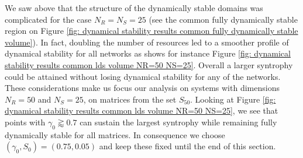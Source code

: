 \documentclass[12pt, titlepage]{report}
\begin{document}
We saw above that the structure of the dynamically stable domains was complicated for the case $N_R=N_S=25$ (see \eg the common fully dynamically stable region on Figure \ref{fig: dynamical stability results common fully dynamically stable volume}). In fact, doubling the number of resources led to a smoother profile of dynamical stability for all networks as shows for instance Figure \ref{fig: dynamical stability results common lds volume NR=50 NS=25}. Overall a larger syntrophy could be attained without losing dynamical stability for any of the networks. These considerations make us focus our analysis on systems with dimensions $N_R=50$ and $N_S=25$, \ie on matrices from the set $S_{50}$.
Looking at Figure \ref{fig: dynamical stability results common lds volume NR=50 NS=25}, we see that points with $\gamma_0 \gtrapprox 0.7$ can sustain the largest syntrophy while remaining fully dynamically stable for all matrices. In consequence we choose $(\gamma_0, S_0)=(0.75, 0.05)$ and keep these fixed until the end of this section.
\end{document}
